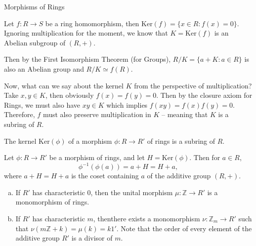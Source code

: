 \begin{section}{Morphisms of Rings}
\begin{prop}
  Let $f \colon R \to S$ be a ring homomorphism, then $\textrm{Ker}(f) = \{ x \in R \colon f(x) = 0 \}$. Ignoring multiplication for the moment, we know that $K = \text{Ker}(f)$ is an Abelian subgroup of $(R,+)$. 

  Then by the First Isomorphism Theorem (for Groups), $R/K = \{ a + K \colon a \in R \}$ is also an Abelian group and $R/K \simeq f(R)$.
\end{prop}

\begin{rmk}
Now, what can we say about the kernel $K$ from the perspective of multiplication? Take $x,y \in K$, then obviously $f(x) = f(y) = 0$. Then by the closure axiom for Rings, we must also have $xy \in K$ which implies $f(xy) = f(x)f(y) = 0$. Therefore, $f$ must also preserve multiplication in $K$ -- meaning that $K$ is a subring of $R$.
\end{rmk}

\begin{prop}
  The kernel $\textrm{Ker}(\phi)$ of a morphism $\phi \colon R \to R'$ of rings is a subring of $R$.
\end{prop}

\begin{thm}
Let $\phi \colon R \to R'$ be a morphism of rings, and let $H = \textrm{Ker}(\phi)$. Then for $a \in R$,  $$\phi^{-1}(\phi(a)) = a + H = H + a,$$ where $a + H = H + a$ is the coset containing $a$ of the additive group $(R,+)$.
\end{thm}


\begin{ex}
\begin{enumerate}[(a)]
\item If $R'$ has characteristic $0$, then the unital morphism $\mu \colon \mathbb{Z} \to R'$ is a monomorphism of rings.
\item If $R'$ has characteristic $m$, thenthere exists a monomorphism $\nu \colon \mathbb{Z}_{m} \to R'$ such that $\nu(m\mathbb{Z} + k) = \mu(k) = k1'$. Note that the order of every element of the additive group $R'$ is a divisor of $m$.
\end{enumerate}
\end{ex}

\end{section}

